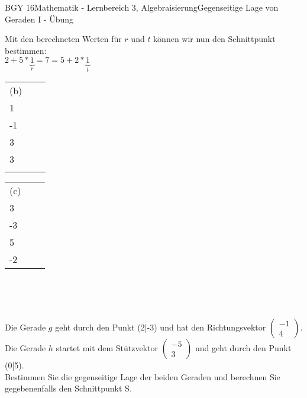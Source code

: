 \documentclass[oneside,openany,headings=optiontotoc,11pt,numbers=noenddot]{scrreprt}
\begin{document}
\begin{worksheet}{BGY 16}{Mathematik - Lernbereich 3, Algebraisierung}{Gegenseitige Lage von Geraden I - Übung}
\begin{framed}
			Mit den berechneten Werten für \(r\) und \(t\) können wir nun den Schnittpunkt bestimmen:\\
			\(2 + 5*\underbrace{1}_{r} = 7 = 5 + 2*\underbrace{1}_{t}\)\\
			\begin{tabularx}{\textwidth}{lXX}
				(b) & \(g: \vec{x} = \left(\begin{array}{c}-4\\1\end{array}\right) + r\left(\begin{array}{c}-2\\-1\end{array}\right)\) &	\(h: \vec{x} = \left(\begin{array}{c}0\\3\end{array}\right) + t\left(\begin{array}{c}6\\3\end{array}\right)\)\\
				&&\\
			\end{tabularx}
			\begin{tabularx}{\textwidth}{lXX}
				(c) & \(g: \vec{x} = \left(\begin{array}{c}1\\3\end{array}\right) + r\left(\begin{array}{c}9\\-3\end{array}\right)\) &	\(h: \vec{x} = \left(\begin{array}{c}4\\5\end{array}\right) + t\left(\begin{array}{c}-4\\-2\end{array}\right)\)\\
			\end{tabularx}
			\\
			\par\noindent
			\hdashrule[0.5ex][x]{\textwidth}{0.1mm}{8mm 2pt}\\
			\par\noindent
			Die Gerade \(g\) geht durch den Punkt (2|-3) und hat den Richtungsvektor \(\left(\begin{array}{c}-1\\4\end{array}\right)\). Die Gerade \(h\) startet mit dem Stützvektor \(\left(\begin{array}{c}-5\\3\end{array}\right)\) und geht durch den Punkt (0|5).\\
			Bestimmen Sie die gegenseitige Lage der beiden Geraden und berechnen Sie gegebenenfalls den Schnittpunkt S.
		\end{framed}
	\end{worksheet}
\end{document}
